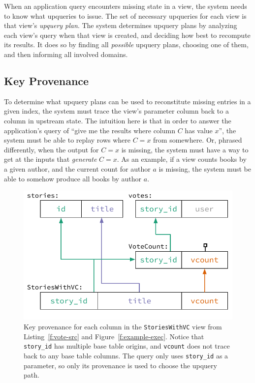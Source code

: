 When an application query encounters missing state in a view, the system needs
to know what upqueries to issue. The set of necessary upqueries for each view is
that view's \textit{upquery plan}. The system determines upquery plans by
analyzing each view's query when that view is created, and deciding how best
to recompute its results. It does so by finding all \emph{possible} upquery
plans, choosing one of them, and then informing all involved domains.

\subsection{Key Provenance}

To determine what upquery plans can be used to reconstitute missing entries in a
given index, the system must trace the view's parameter column back to a column
in upstream state. The intuition here is that in order to answer the
application's query of ``give me the results where column $C$ has value $x$'',
the system must be able to replay rows where $C = x$ from somewhere. Or, phrased
differently, when the output for $C = x$ is missing, the system must have a way
to get at the inputs that \emph{generate} $C = x$. As an example, if a view
counts books by a given author, and the current count for author $a$ is missing,
the system must be able to somehow produce all books by author $a$.

\begin{figure}[t]
  \centering
  \includegraphics{diagrams/Key Provenance.pdf}
  \caption{Key provenance for each column in the \texttt{StoriesWithVC} view
  from Listing~\ref{f:vote-src} and Figure~\ref{f:example-exec}. Notice that
  \texttt{story\_id} has multiple base table origins, and \texttt{vcount} does
  not trace back to any base table columns. The query only uses
  \texttt{story\_id} as a parameter, so only its provenance is used to choose
  the upquery path.}
  \label{f:key-prov}
\end{figure}

